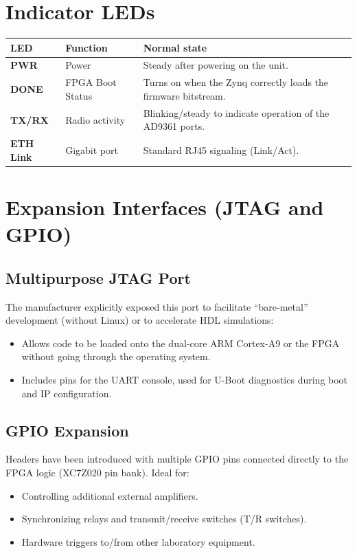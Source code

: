 \documentclass[11pt]{article}
\begin{document}
\section{Indicator LEDs}

\begin{table}[h]
    \centering
    \begin{tabular}{p{}p{}p{}}
        \toprule
        \textbf{LED} & \textbf{Function} & \textbf{Normal state} \\
        \midrule
        \textbf{PWR} & Power & Steady after powering on the unit. \\
        \textbf{DONE} & FPGA Boot Status & Turns on when the Zynq correctly loads the firmware bitstream. \\
        \textbf{TX/RX} & Radio activity & Blinking/steady to indicate operation of the AD9361 ports. \\
        \textbf{ETH Link} & Gigabit port & Standard RJ45 signaling (Link/Act). \\
        \bottomrule
    \end{tabular}
\end{table}

\section{Expansion Interfaces (JTAG and GPIO)}

\subsection*{Multipurpose JTAG Port}
The manufacturer explicitly exposed this port to facilitate ``bare-metal'' development (without Linux) or to accelerate HDL simulations:
\begin{itemize}
    \item Allows code to be loaded onto the dual-core ARM Cortex-A9 or the FPGA without going through the operating system.
    \item Includes pins for the UART console, used for U-Boot diagnostics during boot and IP configuration.
\end{itemize}

\subsection*{GPIO Expansion}
Headers have been introduced with multiple GPIO pins connected directly to the FPGA logic (XC7Z020 pin bank). Ideal for:
\begin{itemize}
    \item Controlling additional external amplifiers.
    \item Synchronizing relays and transmit/receive switches (T/R switches).
    \item Hardware triggers to/from other laboratory equipment.
\end{itemize}
\end{document}
